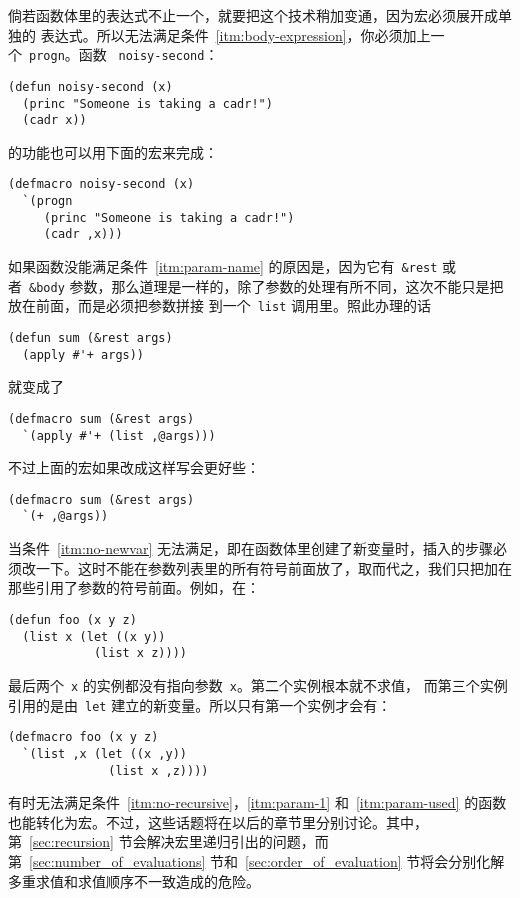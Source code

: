 倘若函数体里的表达式不止一个，就要把这个技术稍加变通，因为宏必须展开成单独的
表达式。所以无法满足条件~\ref{itm:body-expression}，你必须加上一个~\texttt{progn}。函数
~\texttt{noisy-second}：
\begin{lstlisting}
(defun noisy-second (x)
  (princ "Someone is taking a cadr!")
  (cadr x))
\end{lstlisting}
的功能也可以用下面的宏来完成：
\begin{lstlisting}
(defmacro noisy-second (x)
  `(progn
     (princ "Someone is taking a cadr!")
     (cadr ,x)))
\end{lstlisting}

如果函数没能满足条件~\ref{itm:param-name} 的原因是，因为它有~\texttt{\&rest} 或者~\texttt{\&body} 参数，那么道理是一样的，除了参数的处理有所不同，这次不能只是把\comma{}放在前面，而是必须把参数拼接
到一个~\texttt{list} 调用里。照此办理的话
\begin{lstlisting}
(defun sum (&rest args)
  (apply #'+ args))
\end{lstlisting}
就变成了
\begin{lstlisting}
(defmacro sum (&rest args)
  `(apply #'+ (list ,@args)))
\end{lstlisting}
不过上面的宏如果改成这样写会更好些：
\begin{lstlisting}
(defmacro sum (&rest args)
  `(+ ,@args))
\end{lstlisting}

当条件~\ref{itm:no-newvar} 无法满足，即在函数体里创建了新变量时，插入\comma{}的步骤必须改一下。这时不能在参数列表里的所有符号前面放\comma{}了，取而代之，我们只把\comma{}加在那些引用了参数的符号前面。例如，在：
\begin{lstlisting}
(defun foo (x y z)
  (list x (let ((x y))
            (list x z))))
\end{lstlisting}
最后两个~\texttt{x} 的实例都没有指向参数~\texttt{x}。第二个实例根本就不求值，
而第三个实例引用的是由~\texttt{let} 建立的新变量。所以只有第一个实例才会有\comma{}：
\begin{lstlisting}
(defmacro foo (x y z)
  `(list ,x (let ((x ,y))
              (list x ,z))))
\end{lstlisting}

有时无法满足条件~\ref{itm:no-recursive}，\ref{itm:param-1} 和~\ref{itm:param-used} 的函数也能转化为宏。不过，这些话题将在以后的章节里分别讨论。其中，第~\ref{sec:recursion} 节会解决宏里递归引出的问题，而第~\ref{sec:number_of_evaluations} 节和~\ref{sec:order_of_evaluation} 节将会分别化解多重求值和求值顺序不一致造成的危险。

